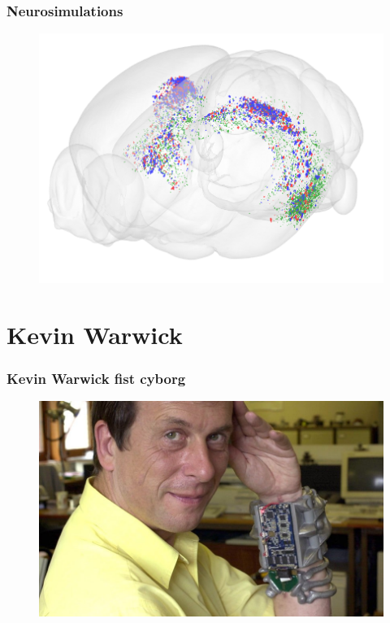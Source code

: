 \documentclass[12pt, aspectratio=169]{beamer}
\begin{document}
\begin{frame}
  \frametitle{Neurosimulations}
  \begin{figure}
    \includegraphics[width=0.7\linewidth]{QUIN_Tpoint_cloud_aa3067ae1d}
  \end{figure}
\end{frame}




\section{Kevin Warwick}
\begin{frame}
  \frametitle{Kevin Warwick fist cyborg}
  \begin{figure}
    \includegraphics[width=0.7\linewidth]{Kevin-Warwick_2936650k}
  \end{figure}
\end{frame}
\end{document}
